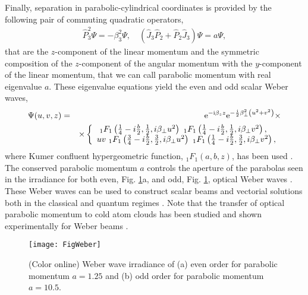 \documentclass[12pt]{iopart}
\begin{document}
Finally, separation in parabolic-cylindrical coordinates is provided by the following pair of commuting quadratic operators,
\begin{eqnarray}
\hat{P}_{3}^2 \Psi = - \beta_{3}^2  \Psi, \quad \left( \hat{J}_{3}\hat{P}_{2} + \hat{P}_{2}\hat{J}_{3} \right)  \Psi = a \Psi,
\end{eqnarray}
that are the $z$-component of the linear momentum and the symmetric composition of the $z$-component of the angular momentum with the $y$-component of the linear momentum, that we can call parabolic momentum with real eigenvalue $a$.
These eigenvalue equations yield the even and odd scalar Weber waves,
	\begin{eqnarray}
	\Psi(u,v,z) &=& {\rm e}^{-{\rm i} \beta_{z} z} {\rm e}^{- \frac{\rm i}{2} \beta_{\perp}^{2} \left( u^2 + v^2\right)} \times \nonumber \\
	&& \times \left\{ \begin{array}{ll}
	~_{1}F_{1}\left( \frac{1}{4} -i\frac{b}{2}, \frac{1}{2}, i \beta_{\perp} u^{2} \right) ~_{1}F_{1}\left( \frac{1}{4} -i\frac{b}{2}, \frac{1}{2}, i \beta_{\perp} v^{2} \right),  \\
	u v  ~_{1}F_{1}\left( \frac{3}{4} -i\frac{b}{2}, \frac{3}{2}, i \beta_{\perp} u^{2} \right) ~_{1}F_{1}\left( \frac{1}{4} -i\frac{b}{2}, \frac{3}{2}, i \beta_{\perp} v^{2} \right),
	\end{array} \right.
	\end{eqnarray}
where Kumer confluent hypergeometric function, $_{1}F_{1}(a,b,z)$, has been used \cite{Lebedev1965}.
The conserved parabolic momentum $a$ controls the aperture of the parabolas seen in the irradiance for both even, Fig. \ref{fig:FigWeber}a, and odd, Fig. \ref{fig:FigWeber}, optical Weber waves \cite{RodriguezLara2009p055806}.
These Weber waves can be used to construct scalar beams \cite{Bandres2004p44} and vectorial solutions both in the classical and quantum regimes \cite{RodriguezLara2009p055806}.
Note that the transfer of optical parabolic momentum to cold atom clouds has been studied \cite{RodriguezLara2009p011813R,PerezPascual2011p035303} and shown experimentally for Weber beams \cite{HernandezCedillo2013p023404}.

\begin{figure}
\center	\texttt{[image: FigWeber]}
	\caption{(Color online) Weber wave irradiance of (a) even order for parabolic momentum $a=1.25$ and (b) odd order for parabolic momentum $a=10.5$.}
	\label{fig:FigWeber}
\end{figure}
\end{document}
